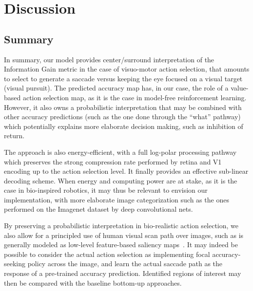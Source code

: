 \section{Discussion}
\label{sec:discussion}
\subsection{Summary}

In summary,  our model provides center/surround interpretation of the Information Gain metric in the case of visuo-motor action selection, that amounts to select to generate a saccade versus keeping the eye focused on a visual target (visual pursuit).
The predicted accuracy map has, in our case, the role of a value-based action selection map, as it is the case in model-free reinforcement learning. However, it also owns a probabilistic interpretation that may be combined with other accuracy predictions (such as the one done through the ``what'' pathway) which potentially explains more elaborate decision making, such as inhibition of return. 




The approach is also energy-efficient, with a full log-polar processing pathway which preserves the strong compression rate performed by retina and V1 encoding up to the action selection level. It finally provides an effective sub-linear decoding scheme. When energy and computing power are at stake, as it is the case in bio-inspired robotics, it may thus be relevant to envision our implementation, with more elaborate image categorization such as the ones performed on the Imagenet dataset by deep convolutional nets.

By preserving a probabilistic interpretation in bio-realistic action selection, we also allow for a principled use of human visual scan path over images, such as is generally modeled as low-level feature-based saliency maps~\citep{Itti01}. It may indeed be possible to consider the actual action selection as implementing focal accuracy-seeking policy across the image, and learn the actual saccade path as the response of a pre-trained accuracy prediction. Identified regions of interest may then be compared with the baseline bottom-up approaches.

